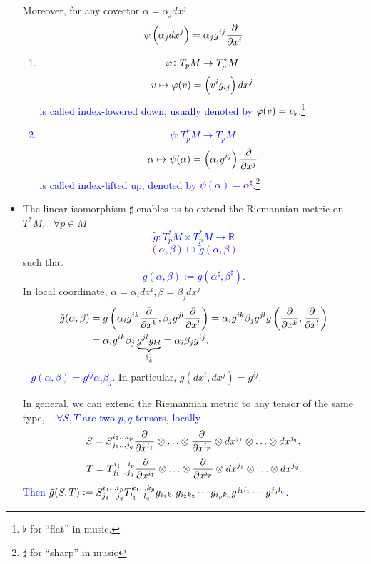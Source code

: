 \begin{itemize}
Moreover, for any covector \(\alpha=\alpha_j dx^j\)
\[
    \psi\left(\alpha_j dx^j\right)=\alpha_j g^{ij}\pdv{x^i}    
\]
\textcolor{blue}{
    \begin{definition}
        \begin{enumerate}[(1)]
            \item \[\varphi\colon T_p M\to T^*_p M\]
            \[v\mapsto\varphi(v)=\left(v^ig_{ij}\right)d x^j\]
            is called index-lowered down, usually denoted by 
            \(\varphi(v)=v_\flat\).\footnote{\(\flat\) for ``flat'' in music.}
            \item \[\psi\colon T^*_p M\to T_p M\]
            \[
                \alpha\mapsto \psi(\alpha)=\left(\alpha_i g^{ij}\right)
                \pdv{x^j}    
            \]
            is called index-lifted up, denoted by \(\psi(\alpha)
            =\alpha^{\sharp}\).\footnote{\(\sharp\) for ``sharp'' in music}
        \end{enumerate}
    \end{definition}
}
\item The linear isomorphism \(\sharp\) enables us to extend the Riemannian
metric on \(T^* M\), \ie\ \(\forall p\in M\)
\textcolor{blue}{
    \[
        \tilde{g}\colon T^*_p M\times T^*_p M\to\mathbb{R}    
    \]
    \[
        (\alpha,\beta)\mapsto \tilde{g}(\alpha,\beta)    
    \]
}
such that
\textcolor{blue}{
    \[
        \tilde{g}(\alpha,\beta):=g\left(\alpha^\sharp,\beta^\sharp\right)    .
    \]
}
In local coordinate, \(\alpha=\alpha_i dx^i,\beta=\beta_j dx^j\)
\begin{align*}
    \tilde{g}(\alpha,\beta)&= g\left(\alpha_i g^{ik}\pdv{x^k}
    ,\beta_j g^{jl}\pdv{x^l}\right)=\alpha_i g^{ik}\beta_j g^{jl}g
    \left(\pdv{x^k},\pdv{x^l}\right)\\
    &=\alpha_i g^{ik}\beta_j \underbrace{g^{jl}g_{kl}}_{\delta^j_k}
    =\alpha_i\beta_j g^{ij}.
\end{align*}
\ie\ \textcolor{blue}{
    \(\tilde{g}(\alpha,\beta)=g^{ij}\alpha_i\beta_j\)}.
In particular, \(\tilde{g}\left(dx^i,dx^j\right)=g^{ij}\). 

In general, we can extend the Riemannian metric to any tensor of the same
type, \ie\ 
\textcolor{blue}{
    \(\forall S, T\) are two \(p,q\) tensors, locally
    \[
        S=\tensor*{S}{^{i_1\ldots i_p}_{j_1\ldots j_q}}
        \pdv{x^{i_1}}\otimes \ldots \otimes\pdv{x^{i_p}}\otimes 
        dx^{j_1}\otimes\ldots \otimes dx^{j_q}.    
    \]
    \[
        T=\tensor*{T}{^{i_1\ldots i_p}_{j_1\ldots j_q}}
        \pdv{x^{i_1}}\otimes \ldots \otimes\pdv{x^{i_p}}\otimes 
        dx^{j_1}\otimes\ldots \otimes dx^{j_q}.    
    \]
    Then \(\tilde{g}(S,T):=\tensor*{S}{^{i_1\ldots i_p}_{j_1\ldots j_q}}
    \tensor*{T}{^{k_1\ldots k_p}_{l_1\ldots l_q}} g_{i_1k_1}g_{i_2k_2}
    \cdots g_{i_p k_p} g^{j_1 l_1}\cdots g^{j_q l_q}\).
}
\end{itemize}
